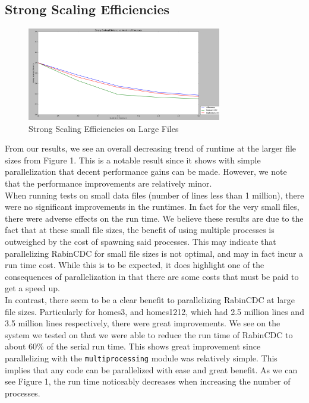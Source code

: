 \documentclass{acmtog} %
\begin{document}
	\subsection{Strong Scaling Efficiencies}

	

		\begin{figure}
			\centerline{\includegraphics[width=8.5cm]{img/StrongScalingLargeFile}}
			\caption{Strong Scaling Efficiencies on Large Files}
			\label{fig:strongscalelarge}
		\end{figure}
	From our results, we see an overall decreasing trend of runtime at the larger file sizes from Figure 1. This is a notable result since it shows with simple parallelization that decent performance gains can be made. However, we note that the performance improvements are relatively minor.\\
	
	When running tests on small data files (number of lines less than 1 million), there were no significant improvements in the runtimes. In fact for the very small files, there were adverse effects on the run time. We believe these results are due to the fact that at these small file sizes, the benefit of using multiple processes is outweighed by the cost of spawning said processes. This may indicate that parallelizing RabinCDC for small file sizes is not optimal, and may in fact incur a run time cost. While this is to be expected, it does highlight one of the consequences of parallelization in that there are some costs that must be paid to get a speed up.\\
	
	In contrast, there seem to be a clear benefit to parallelizing RabinCDC at large file sizes. Particularly for homes3, and homes1212, which had 2.5 million lines and 3.5 million lines respectively, there were great improvements. We see on the system we tested on that we were able to reduce the run time of RabinCDC to about 60\% of the serial run time. This shows great improvement since parallelizing with the \texttt{multiprocessing} module was relatively simple. This implies that any code can be parallelized with ease and great benefit. As we can see Figure 1, the run time noticeably decreases when increasing the number of processes. \\
	
\end{document}
